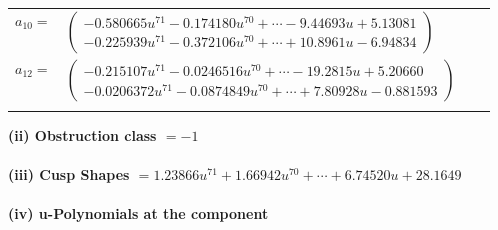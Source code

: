 \documentclass[1p]{elsarticle_modified}
\theoremstyle{definition}
\begin{document}
\begin{tabular}{m{7pt} m{180pt} m{7pt} m{180pt} }
\flushright $a_{10}=$&$\begin{pmatrix}-0.580665 u^{71}-0.174180 u^{70}+\cdots-9.44693 u+5.13081\\-0.225939 u^{71}-0.372106 u^{70}+\cdots+10.8961 u-6.94834\end{pmatrix}$ \\
\flushright $a_{12}=$&$\begin{pmatrix}-0.215107 u^{71}-0.0246516 u^{70}+\cdots-19.2815 u+5.20660\\-0.0206372 u^{71}-0.0874849 u^{70}+\cdots+7.80928 u-0.881593\end{pmatrix}$\\&\end{tabular}
\flushleft \textbf{(ii) Obstruction class $= -1$}\\~\\
\flushleft \textbf{(iii) Cusp Shapes $= 1.23866 u^{71}+1.66942 u^{70}+\cdots+6.74520 u+28.1649$}\\~\\
\newpage\renewcommand{\arraystretch}{1}
\flushleft \textbf{(iv) u-Polynomials at the component}\newline \\
\end{document}
